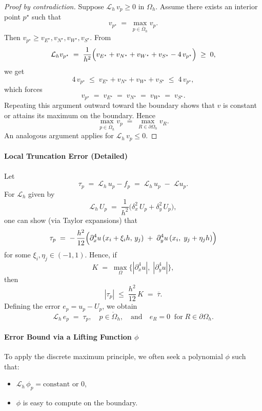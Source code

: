 \begin{proof}[Proof by contradiction]
  Suppose \(\mathcal{L}_h\,v_p \ge 0\) in \(\Omega_h\). Assume there exists an interior point \(p^\star\) such that
  \[
    v_{p^\star} \;=\; \max_{p \in \overline{\Omega}_h} v_p.
  \]
  Then \(v_{p^\star} \ge v_{E^\star}, v_{N^\star}, v_{W^\star}, v_{S^\star}\). From
  \[
    \mathcal{L}_h v_{p^\star} \;=\; \frac{1}{h^2}\Bigl(v_{E^\star} + v_{N^\star} + v_{W^\star} + v_{S^\star} - 4\,v_{p^\star}\Bigr) \;\ge\; 0,
  \]
  we get
  \[
    4\,v_{p^\star} \;\le\; v_{E^\star} + v_{N^\star} + v_{W^\star} + v_{S^\star} \;\le\; 4\,v_{p^\star},
  \]
  which forces
  \[
    v_{p^\star} \;=\; v_{E^\star} \;=\; v_{N^\star} \;=\; v_{W^\star} \;=\; v_{S^\star}.
  \]
  Repeating this argument outward toward the boundary shows that \(v\) is constant or attains its maximum on the boundary. Hence
  \[
    \max_{p \in \overline{\Omega}_h} v_p \;=\; \max_{R \in \partial\Omega_h} v_R.
  \]
  An analogous argument applies for \(\mathcal{L}_h\,v_p \le 0\).
\end{proof}

\paragraph{Local Truncation Error (Detailed)}
Let
\[
  \tau_p
  \;=\;
  \mathcal{L}_h\,u_p - f_p
  \;=\;
  \mathcal{L}_h\,u_p \;-\; \mathcal{L}u_p.
\]
For \(\mathcal{L}_h\) given by
\[
  \mathcal{L}_h\,U_p
  \;=\;
  \frac{1}{h^2}\bigl(\delta_x^2\,U_p + \delta_y^2\,U_p\bigr),
\]
one can show (via Taylor expansions) that
\[
  \tau_p
  \;=\;
  -\,\frac{h^2}{12}\Bigl(\partial_x^4 u\,(x_i + \xi_i h,\,y_j)\;+\;\partial_y^4 u\,(x_i,\;y_j + \eta_j h)\Bigr)
\]
for some \(\xi_i,\eta_j \in (-1,1)\). Hence, if
\[
  K \;=\; \max_{\Omega}\bigl\{|\partial_x^4 u|,\;|\partial_y^4 u|\bigr\},
\]
then
\[
  |\tau_p| \;\le\; \frac{h^2}{12}\,K \;=\; \overline{\tau}.
\]
Defining the error \(e_p = u_p - U_p\), we obtain
\[
  \mathcal{L}_h\,e_p
  \;=\;
  \tau_p,
  \quad
  p \in \mathring{\Omega}_h,
  \quad
  \text{and}
  \quad
  e_R = 0 \;\;\text{for}\; R \in \partial\Omega_h.
\]

\paragraph{Error Bound via a Lifting Function \(\phi\)}
To apply the discrete maximum principle, we often seek a polynomial \(\phi\) such that:

\begin{itemize}
  \item \(\mathcal{L}_h\,\phi_p = \text{constant}\) or \(0\),
  \item \(\phi\) is easy to compute on the boundary.
\end{itemize}

